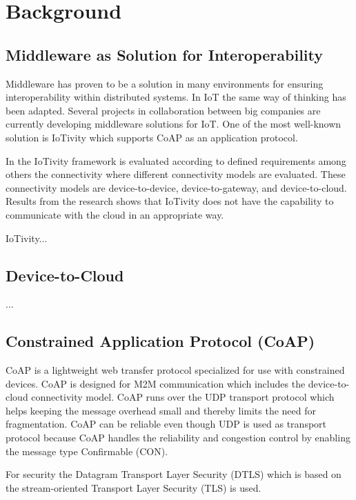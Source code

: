\section{Background}




\subsection{Middleware as Solution for Interoperability}
Middleware has proven to be a solution in many environments for ensuring interoperability within distributed systems. In IoT the same way of thinking has been adapted. 
Several projects in collaboration between big companies are currently developing  middleware solutions for IoT. 
One of the most well-known solution is IoTivity which supports CoAP as an application protocol.
 
In \cite{interoperabilityChallenge} the IoTivity framework is evaluated according to defined requirements among others the connectivity where different connectivity models are evaluated. These connectivity models are device-to-device, device-to-gateway, and device-to-cloud. Results from the research shows that IoTivity does not have the capability to communicate with the cloud in an appropriate way. 

IoTivity...

\subsection{Device-to-Cloud}
...

\subsection{Constrained Application Protocol (CoAP)}
CoAP is a lightweight web transfer protocol specialized for use with constrained devices. CoAP is designed for M2M communication which includes the device-to-cloud connectivity model.
CoAP runs over the UDP transport protocol which helps keeping the message overhead small and thereby limits the need for fragmentation.
CoAP can be reliable even though UDP is used as transport protocol because CoAP handles the reliability and congestion control by enabling the message type Confirmable (CON).
 
For security the Datagram Transport Layer Security (DTLS) which is based on the stream-oriented Transport Layer Security (TLS) is used.
 
